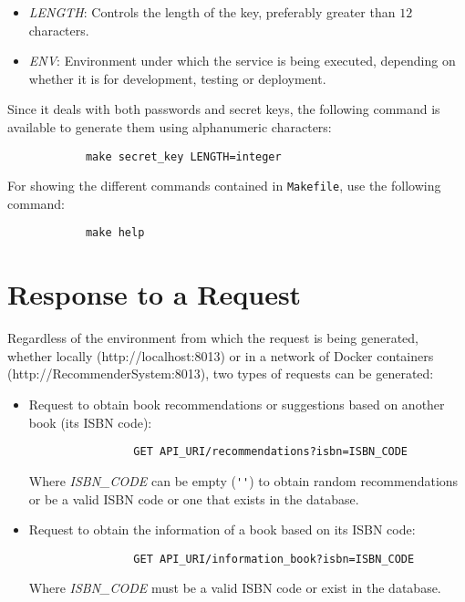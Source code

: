 \documentclass[12pt,a4paper]{article}
\begin{document}
{{            \begin{itemize}[label=$\bullet$]
                \item \emph{LENGTH}: Controls the length of the key, preferably greater than $12$ characters.
                \item \emph{ENV}: Environment under which the service is being executed, depending on whether it is for development, testing or deployment.
            \end{itemize}

            Since it deals with both passwords and secret keys, the following command 
            is available to generate them using alphanumeric characters:

            \begin{verbatim}
            make secret_key LENGTH=integer
            \end{verbatim}

            For showing the different commands contained in \verb*|Makefile|, use the 
            following command:

            \begin{verbatim}
            make help
            \end{verbatim}
        }
    }

    \newpage

    \section{Response to a Request}\label{sec:Request}
    {
        Regardless of the environment from which the request is being generated, whether locally 
        (http://localhost:8013) or in a network of Docker containers (http://RecommenderSystem:8013), 
        two types of requests can be generated:

        \begin{itemize}
            \item Request to obtain book recommendations or suggestions based on another book (its ISBN code):
            \begin{verbatim}
                GET API_URI/recommendations?isbn=ISBN_CODE
            \end{verbatim}
            Where \emph{ISBN\_CODE} can be empty (\verb*|''|) to obtain random recommendations or be a valid 
            ISBN code or one that exists in the database.

            \item Request to obtain the information of a book based on its ISBN code:
            \begin{verbatim}
                GET API_URI/information_book?isbn=ISBN_CODE
            \end{verbatim}
            Where \emph{ISBN\_CODE} must be a valid ISBN code or exist in the database.
        \end{itemize}
    }
\end{document}
